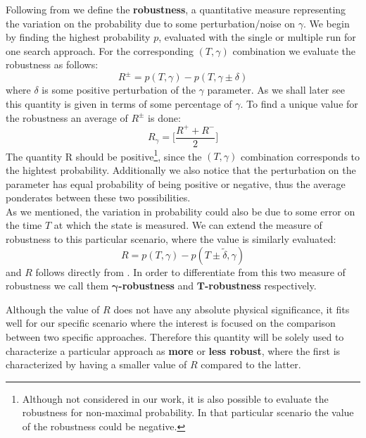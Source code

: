         Following from \cite{SH.HungS.Hietala2019} we define the \textbf{robustness}, a quantitative measure representing the variation on the probability due to some perturbation/noise on $\gamma$.
        We begin by finding the highest probability $p$, evaluated with the single or multiple run for one search approach. For the corresponding $(T,\gamma)$ combination we evaluate the robustness as follows:
        \begin{equation}
            R ^\pm = p(T, \gamma) - p(T, \gamma \pm \delta)
        \end{equation}
        where $\delta$ is some positive perturbation of the $\gamma$ parameter. As we shall later see this quantity is given in terms of some percentage of $\gamma$. To find a unique value for the robustness an average of $R^\pm$ is done:
        \begin{equation}
            R_\gamma = \bigg[\frac{R^++ R^-}{2}\bigg]
            \label{eq:robustness}
        \end{equation}
        The quantity R should be positive\footnote{ Although not considered in our work, it is also possible to evaluate the robustness for non-maximal probability. In that particular scenario the value of the robustness could be negative.}, since the $(T,\gamma)$ combination corresponds to the hightest probability. Additionally we also notice that the perturbation on the parameter has equal probability of being positive or negative, thus the average ponderates between these two possibilities. \\

        \noindent
        As we mentioned, the variation in probability could also be due to some error on the time $T$ at which the state is measured. We can extend the measure of robustness to this particular scenario, where the value is similarly evaluated:
        \begin{equation}
            R = p(T, \gamma) - p(T \pm \tilde{\delta}, \gamma )
        \end{equation}
        and $R$ follows directly from .
        In order to differentiate from this two measure of robustness we call them \textbf{$\bm{\gamma}$-robustness} and \textbf{$\bm{T}$-robustness} respectively.


        Although the value of $R$ does not have any absolute physical significance, it fits well for our specific scenario where the interest is focused on the comparison between two specific approaches. Therefore this quantity will be solely used to characterize a particular approach as \textbf{more} or \textbf{less robust}, where the first is characterized by having a smaller value of $R$ compared to the latter.

